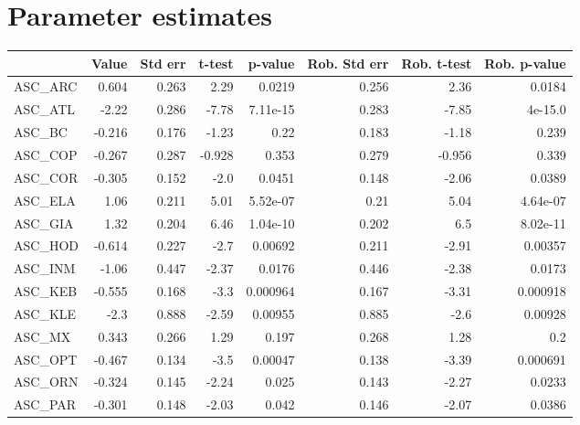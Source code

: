 \section{Parameter estimates}
\begin{tabular}{lrrrrrrr}
\toprule
{} &   Value &  Std err &  t-test &  p-value &  Rob. Std err &  Rob. t-test &  Rob. p-value \\
\midrule
ASC\_ARC             &   0.604 &    0.263 &    2.29 &   0.0219 &         0.256 &         2.36 &        0.0184 \\
ASC\_ATL             &   -2.22 &    0.286 &   -7.78 & 7.11e-15 &         0.283 &        -7.85 &       4e-15.0 \\
ASC\_BC              &  -0.216 &    0.176 &   -1.23 &     0.22 &         0.183 &        -1.18 &         0.239 \\
ASC\_COP             &  -0.267 &    0.287 &  -0.928 &    0.353 &         0.279 &       -0.956 &         0.339 \\
ASC\_COR             &  -0.305 &    0.152 &    -2.0 &   0.0451 &         0.148 &        -2.06 &        0.0389 \\
ASC\_ELA             &    1.06 &    0.211 &    5.01 & 5.52e-07 &          0.21 &         5.04 &      4.64e-07 \\
ASC\_GIA             &    1.32 &    0.204 &    6.46 & 1.04e-10 &         0.202 &          6.5 &      8.02e-11 \\
ASC\_HOD             &  -0.614 &    0.227 &    -2.7 &  0.00692 &         0.211 &        -2.91 &       0.00357 \\
ASC\_INM             &   -1.06 &    0.447 &   -2.37 &   0.0176 &         0.446 &        -2.38 &        0.0173 \\
ASC\_KEB             &  -0.555 &    0.168 &    -3.3 & 0.000964 &         0.167 &        -3.31 &      0.000918 \\
ASC\_KLE             &    -2.3 &    0.888 &   -2.59 &  0.00955 &         0.885 &         -2.6 &       0.00928 \\
ASC\_MX              &   0.343 &    0.266 &    1.29 &    0.197 &         0.268 &         1.28 &           0.2 \\
ASC\_OPT             &  -0.467 &    0.134 &    -3.5 &  0.00047 &         0.138 &        -3.39 &      0.000691 \\
ASC\_ORN             &  -0.324 &    0.145 &   -2.24 &    0.025 &         0.143 &        -2.27 &        0.0233 \\
ASC\_PAR             &  -0.301 &    0.148 &   -2.03 &    0.042 &         0.146 &        -2.07 &        0.0386 \\

\end{tabular}
